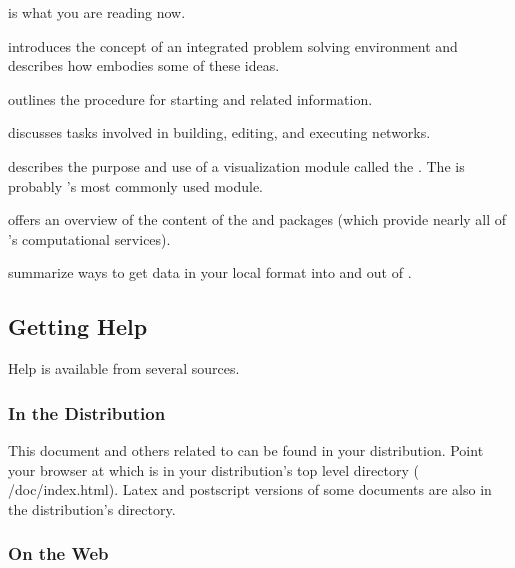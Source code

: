 \begin{description}
  \item {} is what you are reading now.
  \item {} introduces the concept of an
        integrated problem solving environment  and describes how \SR{}
        embodies some of these ideas.
  \item {}  outlines the procedure for
        starting \sr{} and related information.
  \item {} discusses tasks
        involved in building, editing, and executing networks.
  \item {} describes the
        purpose and use of a visualization module called the \viewer{}.  The
        \viewer{} is probably \sr{}'s most commonly used module.
  \item {} offers an overview of the content
        of the \sr{} and \pse{} packages (which provide nearly all of
        \sr{}'s computational services).
  \item {} summarize ways to
        get data in your local format into and out of \SR{}.
\end{description}

\subsection{Getting Help}
\label{sec:help}

Help is available from several sources.

\subsubsection{In the Distribution}

This document and others related to \sr{} can be found in your \sr{}
distribution.  Point your browser at  which is in your
distribution's top level  directory (\ie{} /doc/index.html).  Latex and postscript versions of some
documents are also in the distribution's  directory.

\subsubsection{On the Web}

